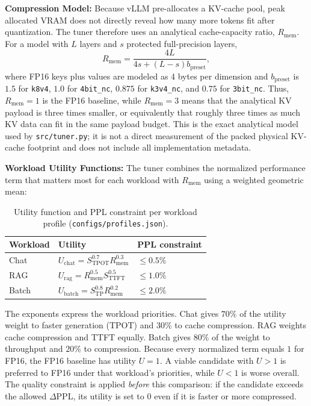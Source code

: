 \documentclass[10pt]{article}
\begin{document}
\textbf{Compression Model:}
Because vLLM pre-allocates a KV-cache pool, peak allocated VRAM does not directly reveal how many more tokens fit after quantization. The tuner therefore uses an analytical cache-capacity ratio, $R_{\mathrm{mem}}$. For a model with $L$ layers and $s$ protected full-precision layers,
\[
R_{\mathrm{mem}}
=
\frac{4L}
     {4s+(L-s)b_{\mathrm{preset}}},
\]
where FP16 keys plus values are modeled as 4 bytes per dimension and $b_{\mathrm{preset}}$ is $1.5$ for \texttt{k8v4}, $1.0$ for \texttt{4bit\_nc}, $0.875$ for \texttt{k3v4\_nc}, and $0.75$ for \texttt{3bit\_nc}. Thus, $R_{\mathrm{mem}}=1$ is the FP16 baseline, while $R_{\mathrm{mem}}=3$ means that the analytical KV payload is three times smaller, or equivalently that roughly three times as much KV data can fit in the same payload budget. This is the exact analytical model used by \texttt{src/tuner.py}; it is not a direct measurement of the packed physical KV-cache footprint and does not include all implementation metadata.

\textbf{Workload Utility Functions:}
The tuner combines the normalized performance term that matters most for each workload with $R_{\mathrm{mem}}$ using a weighted geometric mean:
\begin{table}[h]
\centering\small
\caption{Utility function and PPL constraint per workload profile (\texttt{configs/profiles.json}).}
\label{tab:profiles}
\begin{tabular}{@{}lll@{}}
\toprule
\textbf{Workload} & \textbf{Utility} & \textbf{PPL constraint} \\
\midrule
Chat  & $U_{\mathrm{chat}}=S_{\mathrm{TPOT}}^{0.7}R_{\mathrm{mem}}^{0.3}$ & $\le 0.5\%$ \\
RAG   & $U_{\mathrm{rag}}=R_{\mathrm{mem}}^{0.5}S_{\mathrm{TTFT}}^{0.5}$ & $\le 1.0\%$ \\
Batch & $U_{\mathrm{batch}}=S_{\mathrm{TP}}^{0.8}R_{\mathrm{mem}}^{0.2}$ & $\le 2.0\%$ \\
\bottomrule
\end{tabular}
\end{table}

The exponents express the workload priorities. Chat gives $70\%$ of the utility weight to faster generation (TPOT) and $30\%$ to cache compression. RAG weights cache compression and TTFT equally. Batch gives $80\%$ of the weight to throughput and $20\%$ to compression. Because every normalized term equals $1$ for FP16, the FP16 baseline has utility $U=1$. A viable candidate with $U>1$ is preferred to FP16 under that workload's priorities, while $U<1$ is worse overall. The quality constraint is applied \emph{before} this comparison: if the candidate exceeds the allowed $\Delta$PPL, its utility is set to $0$ even if it is faster or more compressed.
\end{document}
